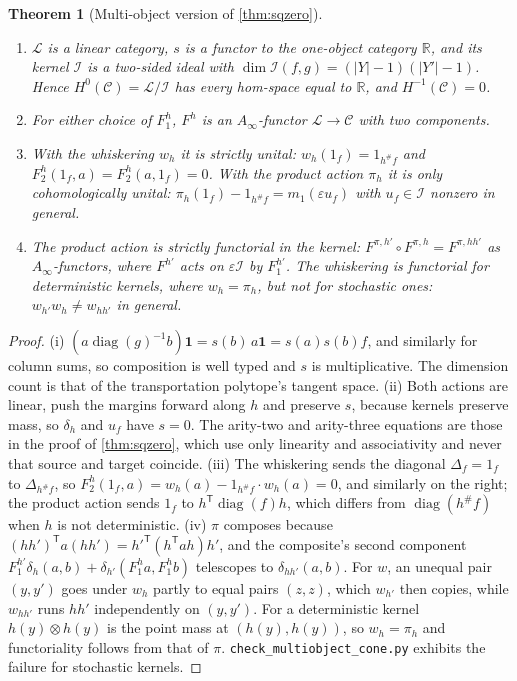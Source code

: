 \documentclass[11pt]{article}
\newtheorem{theorem}{Theorem}[section]
\theoremstyle{definition}
\theoremstyle{remark}
\begin{document}
\begin{theorem}[Multi-object version of \cref{thm:sqzero}]\label{thm:multicone}
\begin{enumerate}[label=(\roman*)]
\item $\mathcal L$ is a linear category, $s$ is a functor to the one-object category $\mathbb R$, and its kernel $\mathcal I$ is a
  two-sided ideal with $\dim\mathcal I(f,g)=(\lvert Y\rvert-1)(\lvert Y'\rvert-1)$. Hence $H^0(\mathcal C)=\mathcal L/\mathcal I$ has every
  hom-space equal to $\mathbb R$, and $H^{-1}(\mathcal C)=0$.
\item For either choice of $F_1^h$, $F^h$ is an $A_\infty$-functor $\mathcal L\to\mathcal C$ with two components.
\item With the whiskering $w_h$ it is strictly unital: $w_h(1_f)=1_{h^\#f}$ and $F_2^h(1_f,a)=F_2^h(a,1_f)=0$. With the product
  action $\pi_h$ it is only cohomologically unital: $\pi_h(1_f)-1_{h^\#f}=m_1(\varepsilon u_f)$ with $u_f\in\mathcal I$ nonzero in general.
\item The product action is strictly functorial in the kernel: $F^{\pi,h'}\circ F^{\pi,h}=F^{\pi,hh'}$ as $A_\infty$-functors, where
  $F^{h'}$ acts on $\varepsilon\mathcal I$ by $F_1^{h'}$. The whiskering is functorial for deterministic kernels, where $w_h=\pi_h$, but
  not for stochastic ones: $w_{h'}w_h\ne w_{hh'}$ in general.
\end{enumerate}
\end{theorem}
\begin{proof}
(i) $(a\operatorname{diag}(g)^{-1}b)\mathbf 1=s(b)\,a\mathbf 1=s(a)s(b)f$, and similarly for column sums, so composition is well typed
and $s$ is multiplicative. The dimension count is that of the transportation polytope's tangent space. (ii) Both actions are linear, push the margins forward along $h$ and preserve $s$, because kernels preserve
mass, so $\delta_h$ and $u_f$ have $s=0$. The arity-two and arity-three equations are those in the proof of \cref{thm:sqzero},
which use only linearity and associativity and never that source and target coincide. (iii) The whiskering sends the
diagonal $\Delta_f=1_f$ to $\Delta_{h^\#f}$, so $F_2^h(1_f,a)=w_h(a)-1_{h^\#f}\cdot w_h(a)=0$, and similarly on the right; the product
action sends $1_f$ to $h^{\mathsf T}\operatorname{diag}(f)h$, which differs from $\operatorname{diag}(h^\#f)$ when $h$ is not deterministic.
(iv) $\pi$ composes because $(hh')^{\mathsf T}a(hh')=h'^{\mathsf T}(h^{\mathsf T}ah)h'$, and the composite's second component
$F_1^{h'}\delta_h(a,b)+\delta_{h'}(F_1^ha,F_1^hb)$ telescopes to $\delta_{hh'}(a,b)$. For $w$, an unequal pair $(y,y')$ goes under
$w_h$ partly to equal pairs $(z,z)$, which $w_{h'}$ then copies, while $w_{hh'}$ runs $hh'$ independently on $(y,y')$. For a
deterministic kernel $h(y)\otimes h(y)$ is the point mass at $(h(y),h(y))$, so $w_h=\pi_h$ and functoriality follows from that of $\pi$.
\texttt{check\_multiobject\_cone.py} exhibits the failure for stochastic kernels.
\end{proof}
\end{document}
